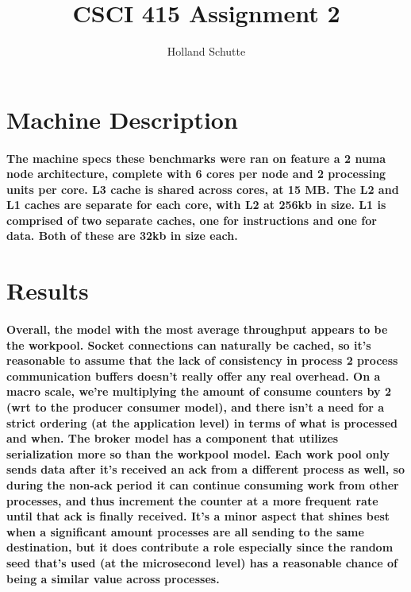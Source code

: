 \documentclass[8pt, a4paper, twoside, twoclumn, english]{extreport}
\begin{document}
\title{CSCI 415 Assignment 2}
\author{Holland Schutte}
\maketitle

\section{Machine Description}

\paragraph{
  The machine specs these benchmarks were ran on feature a 2 numa node architecture,
  complete with 6 cores per node and 2 processing units per core. L3 cache is shared
  across cores, at 15 MB. The L2 and L1 caches are separate for each core, with L2
  at 256kb in size. L1 is comprised of two separate caches,
  one for instructions and one for data. Both of these are 32kb in size each.
}

\section {Results}

\paragraph {
  Overall, the model with the most average throughput appears to be the workpool.
  Socket connections can naturally be cached, so it's reasonable to assume that
  the lack of consistency in process 2 process communication buffers doesn't
  really offer any real overhead. On a macro scale, we're multiplying the amount of
  consume counters by 2 (wrt to the producer consumer model),
  and there isn't a need for a strict ordering (at the application level)
  in terms of what is processed and when. The broker model has a component
  that utilizes serialization more so than the workpool model. Each work pool only sends data
  after it's received an ack from a different process as well, so during the
  non-ack period it can continue consuming work from other processes, and thus
  increment the counter at a more frequent rate until that ack is finally received.
  It's a minor aspect that shines best when a significant amount processes
  are all sending to the same destination, but it does contribute a role
  especially since the random seed that's used (at the microsecond level)
  has a reasonable chance of being a similar value across processes.
}
\end{document}
